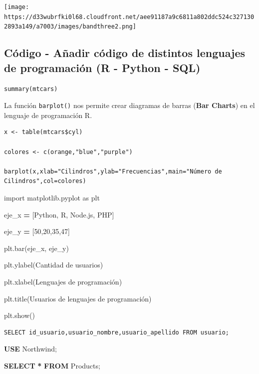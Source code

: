\documentclass[
]{article}
\newenvironment{Shaded}{\begin{snugshade}}{\end{snugshade}}
\newcommand{\DecValTok}[1]{\textcolor[rgb]{0.00,0.00,0.81}{#1}}
\newcommand{\ImportTok}[1]{#1}
\newcommand{\KeywordTok}[1]{\textcolor[rgb]{0.13,0.29,0.53}{\textbf{#1}}}
\newcommand{\NormalTok}[1]{#1}
\newcommand{\OperatorTok}[1]{\textcolor[rgb]{0.81,0.36,0.00}{\textbf{#1}}}
\newcommand{\StringTok}[1]{\textcolor[rgb]{0.31,0.60,0.02}{#1}}
\begin{document}
\texttt{[image: https://d33wubrfki0l68.cloudfront.net/aee91187a9c6811a802ddc524c3271302893a149/a7003/images/bandthree2.png]}

\hypertarget{cuxf3digo---auxf1adir-cuxf3digo-de-distintos-lenguajes-de-programaciuxf3n-r---python---sql}{%
\subsection{Código - Añadir código de distintos lenguajes de
programación (R - Python -
SQL)}\label{cuxf3digo---auxf1adir-cuxf3digo-de-distintos-lenguajes-de-programaciuxf3n-r---python---sql}}

\begin{verbatim}
summary(mtcars)
\end{verbatim}

La función \texttt{barplot()} nos permite crear diagramas de barras
(\textbf{Bar Charts}) en el lenguaje de programación R.

\begin{verbatim}
x <- table(mtcars$cyl)

colores <- c(orange,"blue","purple")

barplot(x,xlab="Cilindros",ylab="Frecuencias",main="Número de Cilindros",col=colores)
\end{verbatim}

\begin{Shaded}
\begin{Highlighting}[]
\ImportTok{import}\NormalTok{ matplotlib.pyplot }\ImportTok{as}\NormalTok{ plt}
 

\NormalTok{eje\_x }\OperatorTok{=}\NormalTok{ [Python, }\StringTok{\textquotesingle{}R\textquotesingle{}}\NormalTok{, }\StringTok{\textquotesingle{}Node.js\textquotesingle{}}\NormalTok{, }\StringTok{\textquotesingle{}PHP\textquotesingle{}}\NormalTok{]}
 

\NormalTok{eje\_y }\OperatorTok{=}\NormalTok{ [}\DecValTok{50}\NormalTok{,}\DecValTok{20}\NormalTok{,}\DecValTok{35}\NormalTok{,}\DecValTok{47}\NormalTok{]}
 

\NormalTok{plt.bar(eje\_x, eje\_y)}
 

\NormalTok{plt.ylabel(}\StringTok{\textquotesingle{}Cantidad de usuarios\textquotesingle{}}\NormalTok{)}
 

\NormalTok{plt.xlabel(}\StringTok{\textquotesingle{}Lenguajes de programación\textquotesingle{}}\NormalTok{)}
 

\NormalTok{plt.title(}\StringTok{\textquotesingle{}Usuarios de lenguajes de programación\textquotesingle{}}\NormalTok{)}
 

\NormalTok{plt.show()}
\end{Highlighting}
\end{Shaded}

\begin{verbatim}
SELECT id_usuario,usuario_nombre,usuario_apellido FROM usuario;
\end{verbatim}

\begin{Shaded}
\begin{Highlighting}[]
\KeywordTok{USE}\NormalTok{ Northwind;}

\KeywordTok{SELECT} \OperatorTok{*} \KeywordTok{FROM}\NormalTok{ Products;}
\end{Highlighting}
\end{Shaded}
\end{document}
